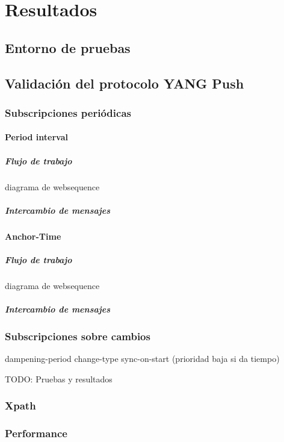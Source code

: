 \chapter{Resultados\label{sec:resultados}}

\section{Entorno de pruebas}

\section{Validación del protocolo YANG Push}

\subsection{Subscripciones periódicas}


\subsubsection{Period interval}

\paragraph{Flujo de trabajo}

diagrama de websequence

\paragraph{Intercambio de mensajes}


\subsubsection{Anchor-Time}

\paragraph{Flujo de trabajo}

diagrama de websequence

\paragraph{Intercambio de mensajes}



\subsection{Subscripciones sobre cambios}

dampening-period
change-type
sync-on-start (prioridad baja si da tiempo)

TODO: Pruebas y resultados

\subsection{Xpath}

\subsection{Performance}

